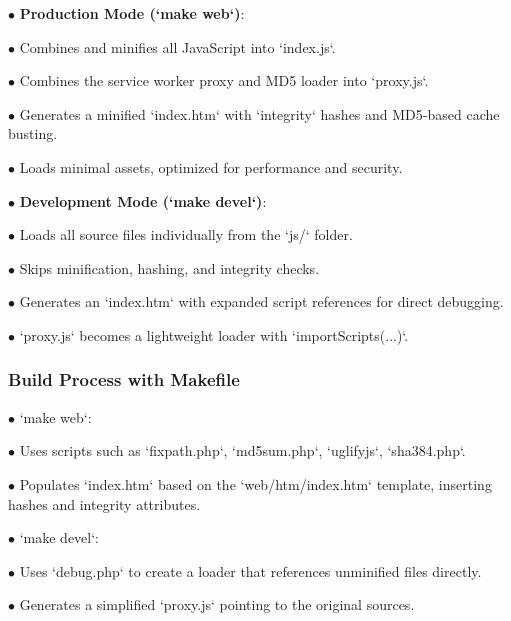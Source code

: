\documentclass[a4paper]{article}
\begin{document}
\begin{compactitem}
\item[\color{myblue}$\bullet$] \textbf{Production Mode (`make web`)}:
  \begin{compactitem}
  \item[\color{myblue}$\bullet$] Combines and minifies all JavaScript into `index.js`.
  \item[\color{myblue}$\bullet$] Combines the service worker proxy and MD5 loader into `proxy.js`.
  \item[\color{myblue}$\bullet$] Generates a minified `index.htm` with `integrity` hashes and MD5-based cache busting.
  \item[\color{myblue}$\bullet$] Loads minimal assets, optimized for performance and security.
  \end{compactitem}
\item[\color{myblue}$\bullet$] \textbf{Development Mode (`make devel`)}:
  \begin{compactitem}
  \item[\color{myblue}$\bullet$] Loads all source files individually from the `js/` folder.
  \item[\color{myblue}$\bullet$] Skips minification, hashing, and integrity checks.
  \item[\color{myblue}$\bullet$] Generates an `index.htm` with expanded script references for direct debugging.
  \item[\color{myblue}$\bullet$] `proxy.js` becomes a lightweight loader with `importScripts(...)`.
  \end{compactitem}
\end{compactitem}

\hypertarget{toc28}{}
\subsubsection{Build Process with Makefile}

\begin{compactitem}
\item[\color{myblue}$\bullet$] `make web`:
  \begin{compactitem}
  \item[\color{myblue}$\bullet$] Uses scripts such as `fixpath.php`, `md5sum.php`, `uglifyjs`, `sha384.php`.
  \item[\color{myblue}$\bullet$] Populates `index.htm` based on the `web/htm/index.htm` template, inserting hashes and integrity attributes.
  \end{compactitem}
\item[\color{myblue}$\bullet$] `make devel`:
  \begin{compactitem}
  \item[\color{myblue}$\bullet$] Uses `debug.php` to create a loader that references unminified files directly.
  \item[\color{myblue}$\bullet$] Generates a simplified `proxy.js` pointing to the original sources.
  \end{compactitem}
\end{compactitem}
\end{document}
